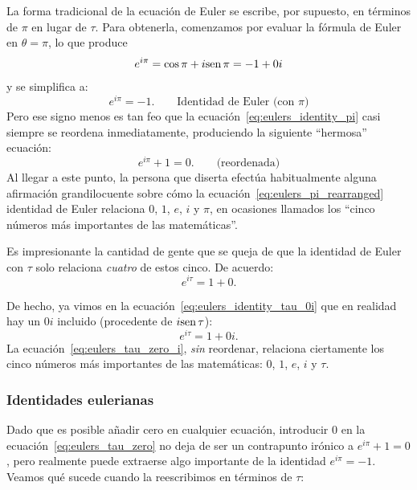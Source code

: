 La forma tradicional de la ecuación de Euler se escribe, por supuesto, en términos de $\pi$ en lugar de $\tau$. Para obtenerla, comenzamos por evaluar la fórmula de Euler en $\theta = \pi$, lo que produce
\begin{equation}
\label{eq:eulers_identity_pi_unsimplified}
e^{i\pi} = \cos \pi + i \mbox{sen}\, \pi = -1 + 0i
\end{equation}
y se simplifica a:
\begin{equation}
\label{eq:eulers_identity_pi}
e^{i\pi} = -1. \qquad\mbox{Identidad de Euler (con $\pi$)}
\end{equation}
Pero ese signo menos es tan feo que la ecuación~\eqref{eq:eulers_identity_pi} casi siempre se reordena inmediatamente, produciendo la siguiente ``hermosa'' ecuación:
\begin{equation}
\label{eq:eulers_pi_rearranged}
e^{i\pi} + 1 = 0. \qquad\mbox{(reordenada)}
\end{equation}
Al llegar a este punto, la persona que diserta efectúa habitualmente alguna afirmación grandilocuente sobre cómo la ecuación~\eqref{eq:eulers_pi_rearranged} identidad de Euler relaciona $0$, $1$, $e$, $i$ y $\pi$, en ocasiones llamados los ``cinco números más importantes de las matemáticas''. 

Es impresionante la cantidad de gente que se queja de que la identidad de Euler con $\tau$ solo relaciona \emph{cuatro} de estos cinco. De acuerdo:
\begin{equation} 
  \label{eq:eulers_tau_zero}
e^{i\tau} = 1 + 0.
\end{equation}

De hecho, ya vimos en la ecuación~\eqref{eq:eulers_identity_tau_0i} que en realidad hay un $0i$ incluido (procedente de $i \mbox{sen}\,\tau$):
\begin{equation}
\label{eq:eulers_tau_zero_i}
e^{i\tau} = 1 + 0i.
\end{equation}
La ecuación~\eqref{eq:eulers_tau_zero_i}, \emph{sin} reordenar, relaciona ciertamente los cinco números más importantes de las matemáticas: $0$, $1$, $e$, $i$ y $\tau$.

      \subsubsection{Identidades eulerianas} %
      \label{sec:eulerian_identities}

Dado que es posible añadir cero en cualquier ecuación, introducir $0$ en la ecuación~\eqref{eq:eulers_tau_zero} no deja de ser un contrapunto irónico a $e^{i\pi} + 1 = 0$, pero realmente puede extraerse algo importante de la identidad $e^{i\pi} = -1$. Veamos qué sucede cuando la reescribimos en términos de $\tau$:

